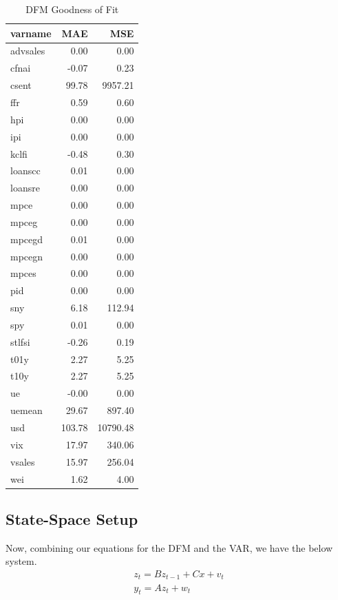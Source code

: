 \documentclass[11pt, letterpaper]{article}\usepackage[]{graphicx}\usepackage[]{color}
\begin{document}
\begin{table}[!h]
\centering
\begingroup\footnotesize
\begin{tabular}{lrr}
  \hline
varname & MAE & MSE \\ 
  \hline
advsales & 0.00 & 0.00 \\ 
  cfnai & -0.07 & 0.23 \\ 
  csent & 99.78 & 9957.21 \\ 
  ffr & 0.59 & 0.60 \\ 
  hpi & 0.00 & 0.00 \\ 
  ipi & 0.00 & 0.00 \\ 
  kclfi & -0.48 & 0.30 \\ 
  loanscc & 0.01 & 0.00 \\ 
  loansre & 0.00 & 0.00 \\ 
  mpce & 0.00 & 0.00 \\ 
  mpceg & 0.00 & 0.00 \\ 
  mpcegd & 0.01 & 0.00 \\ 
  mpcegn & 0.00 & 0.00 \\ 
  mpces & 0.00 & 0.00 \\ 
  pid & 0.00 & 0.00 \\ 
  sny & 6.18 & 112.94 \\ 
  spy & 0.01 & 0.00 \\ 
  stlfsi & -0.26 & 0.19 \\ 
  t01y & 2.27 & 5.25 \\ 
  t10y & 2.27 & 5.25 \\ 
  ue & -0.00 & 0.00 \\ 
  uemean & 29.67 & 897.40 \\ 
  usd & 103.78 & 10790.48 \\ 
  vix & 17.97 & 340.06 \\ 
  vsales & 15.97 & 256.04 \\ 
  wei & 1.62 & 4.00 \\ 
   \hline
\end{tabular}
\endgroup
\caption{DFM Goodness of Fit} 
\end{table}






\subsection{State-Space Setup}
Now, combining our equations for the DFM and the VAR, we have the below system.
\begin{align*}
z_t = B z_{t-1} + Cx + v_t\\
y_t = A z_t + w_t
\end{align*}
\end{document}
